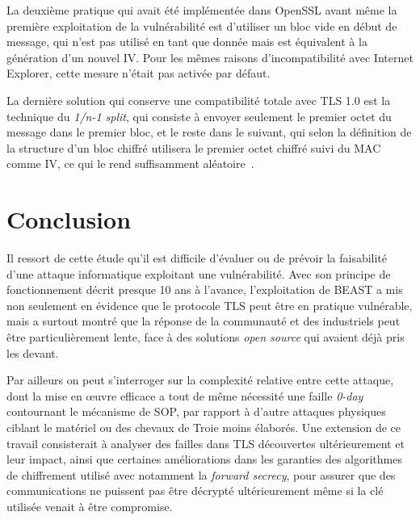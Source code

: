 \documentclass[a4paper,twoside]{article}
\begin{document}
La deuxième pratique qui avait été implémentée dans OpenSSL avant même la
première exploitation de la vulnérabilité est d'utiliser un bloc vide en
début de message, qui n'est pas utilisé en tant que donnée mais est
équivalent à la génération d'un nouvel IV. Pour les mêmes raisons
d'incompatibilité avec Internet Explorer, cette mesure n'était pas activée
par défaut.

La dernière solution qui conserve une compatibilité totale avec TLS 1.0 est
la technique du \emph{1/n-1 split}, qui consiste à envoyer seulement le
premier octet du message dans le premier bloc, et le reste dans le suivant,
qui selon la définition de la structure d'un bloc chiffré utilisera le
premier octet chiffré suivi du MAC comme IV, ce qui le rend suffisamment
aléatoire~\cite{Mozilla:BEAST}.

\section{Conclusion}

Il ressort de cette étude qu'il est difficile d'évaluer ou de prévoir la
faisabilité d'une attaque informatique exploitant une vulnérabilité. Avec
son principe de fonctionnement décrit presque 10 ans à l'avance,
l'exploitation de BEAST a mis non seulement en évidence que le protocole TLS
peut être en pratique vulnérable, mais a surtout montré que la réponse de la
communauté et des industriels peut être particulièrement lente, face à des
solutions \emph{open source} qui avaient déjà pris les devant.

Par ailleurs on peut s'interroger sur la complexité relative entre cette
attaque, dont la mise en œuvre efficace a tout de même nécessité une faille
\emph{0-day} contournant le mécanisme de SOP, par rapport à d'autre attaques
physiques ciblant le matériel ou des chevaux de Troie moins élaborés. Une
extension de ce travail consisterait à analyser des failles dans TLS
découvertes ultérieurement et leur impact, ainsi que certaines améliorations
dans les garanties des algorithmes de chiffrement utilisé avec notamment la
\emph{forward secrecy}, pour assurer que des communications ne puissent pas
être décrypté ultérieurement même si la clé utilisée venait à être
compromise.

\newpage
\small
\nocite{*}


\end{document}
